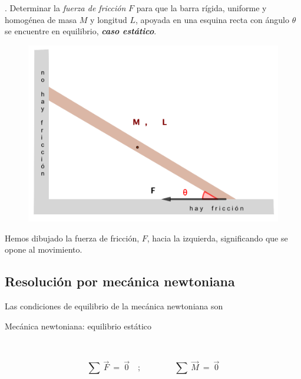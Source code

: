 \begin{example}
.	Determinar la \emph{fuerza de fricción} $F$ para que la barra rígida, uniforme y homogénea de masa $M$ y longitud $L$, apoyada en una esquina recta con ángulo $\theta$ se encuentre en equilibrio, \textbf{\emph{caso estático}}.

	\begin{figure}[H]
		\centering
		\includegraphics[width=.6\textwidth]{imagenes/img01-01.png}
	\end{figure}
	
	\begin{small}
	\textcolor{gris}{Hemos dibujado la fuerza de fricción, $F$, hacia la izquierda,  significando que se opone al movimiento.}	
	\end{small}

\end{example}

\vspace{1cm}
\subsection{Resolución por mecánica newtoniana}
\vspace{0.5cm}

Las condiciones de equilibrio de la mecánica newtoniana son

\vspace{5mm}
\begin{myalertblock}{Mecánica newtoniana: equilibrio estático}

$\,$

\begin{Large}
\begin{equation}
\sum \ \overrightarrow F \ = \ \overrightarrow 0 
\quad ; \qquad \qquad 
\sum \ \overrightarrow M 	\ = \ \overrightarrow 0 
\end{equation}
\end{Large}
	
\end{myalertblock}


